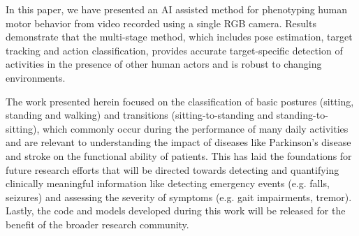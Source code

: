 In this paper, we have presented an AI assisted method for phenotyping human motor behavior from video recorded using a single RGB camera. Results demonstrate that the multi-stage method, which includes pose estimation, target tracking and action classification, provides accurate target-specific detection of activities in the presence of other human actors and is robust to changing environments.

The work presented herein focused on the classification of basic postures (sitting, standing and walking) and transitions (sitting-to-standing and standing-to-sitting), which commonly occur during the performance of many daily activities and are relevant to understanding the impact of diseases like Parkinson's disease and stroke on the functional ability of patients. This has laid the foundations for future research efforts that will be directed towards detecting and quantifying clinically meaningful information like detecting emergency events (e.g. falls, seizures) and assessing the severity of symptoms (e.g. gait impairments, tremor). Lastly, the code and models developed during this work will be released for the benefit of the broader research community.
